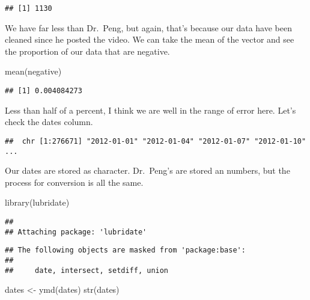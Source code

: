 \documentclass[
]{article}
\newenvironment{Shaded}{\begin{snugshade}}{\end{snugshade}}
\newcommand{\FunctionTok}[1]{\textcolor[rgb]{0.00,0.00,0.00}{#1}}
\newcommand{\NormalTok}[1]{#1}
\newcommand{\OtherTok}[1]{\textcolor[rgb]{0.56,0.35,0.01}{#1}}
\newcommand{\SpecialCharTok}[1]{\textcolor[rgb]{0.00,0.00,0.00}{#1}}
\begin{document}
\begin{verbatim}
## [1] 1130
\end{verbatim}

We have far less than Dr.~Peng, but again, that's because our data have
been cleaned since he posted the video. We can take the mean of the
vector and see the proportion of our data that are negative.

\begin{Shaded}
\begin{Highlighting}[]
\FunctionTok{mean}\NormalTok{(negative)}
\end{Highlighting}
\end{Shaded}

\begin{verbatim}
## [1] 0.004084273
\end{verbatim}

Less than half of a percent, I think we are well in the range of error
here. Let's check the dates column.

\begin{Shaded}
\end{Shaded}

\begin{verbatim}
##  chr [1:276671] "2012-01-01" "2012-01-04" "2012-01-07" "2012-01-10" ...
\end{verbatim}

Our dates are stored as character. Dr.~Peng's are stored an numbers, but
the process for conversion is all the same.

\begin{Shaded}
\begin{Highlighting}[]
\FunctionTok{library}\NormalTok{(lubridate)}
\end{Highlighting}
\end{Shaded}

\begin{verbatim}
## 
## Attaching package: 'lubridate'
\end{verbatim}

\begin{verbatim}
## The following objects are masked from 'package:base':
## 
##     date, intersect, setdiff, union
\end{verbatim}

\begin{Shaded}
\begin{Highlighting}[]
\NormalTok{dates }\OtherTok{\textless{}{-}} \FunctionTok{ymd}\NormalTok{(dates)}
\FunctionTok{str}\NormalTok{(dates)}
\end{Highlighting}
\end{Shaded}
\end{document}
